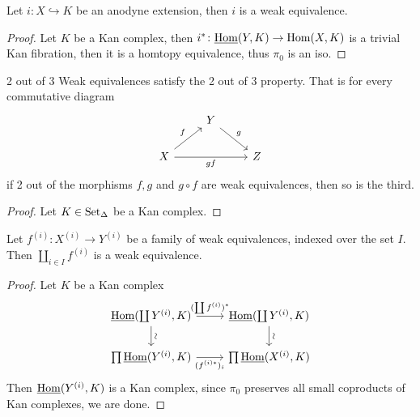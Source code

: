 \begin{prop}
    Let $i \colon X \hookrightarrow K$ be an anodyne extension, then $i$ is a weak equivalence.
\end{prop}

\begin{proof}
    Let $K$ be a Kan complex, then $i^* \colon \underline{\operatorname{Hom}}(Y,K) \to \operatorname{Hom}(X,K) $ is a trivial Kan fibration, then it is a homtopy equivalence, thus $\pi_0$ is an iso.
\end{proof}

\begin{prop}{2 out of 3}
\label{2 out of 3 weak equivalences}
    Weak equivalences satisfy the 2 out of 3 property. 
    That is for every commutative diagram
    \[
    \begin{tikzcd}
        &
        Y
        \ar[rd, "g"]
        &
        \\
        X
        \ar[ru, "f"]
        \ar[rr,"gf"']
        &&
        Z
    \end{tikzcd}
    \]
    if 2 out of the morphisms $f,g$ and $g\circ f$ are weak equivalences, then so is the third.
\end{prop}    

\begin{proof}
    Let $K \in \operatorname{Set}_{\Delta}$ be a Kan complex. 
\end{proof}

\begin{prop}
    Let $f^{(i)}\colon X^{(i)} \to Y^{(i)}$ be a family of weak equivalences, indexed over the set $I$.
    Then $\coprod_{i \in I} f^{(i)}$ is a weak equivalence.
\end{prop}

\begin{proof}
    Let $K$ be a Kan complex 
    \[
    \begin{tikzcd}
        \underline{\Hom}(\coprod Y^{(i)},K)
        \ar[d,sloped, auto= false, "\sim"]
        \ar[r, "(\coprod f^{(i)})^*"]
        &
        \underline{\Hom}(\coprod Y^{(i)}, K)
        \ar[d,sloped, auto= false, "\sim"]
        \\
        \prod \underline{\Hom} ( Y^{(i)}, K) 
        \ar[r, "(f^{(i)*})_i"']
        &
        \prod \underline{\Hom}(X^{(i)},K)
    \end{tikzcd}
    \]
    Then $\underline{\operatorname{Hom}}(Y^{(i)},K)$ is a Kan complex, since $\pi_0$ preserves all small coproducts of Kan complexes, we are done.
\end{proof}

